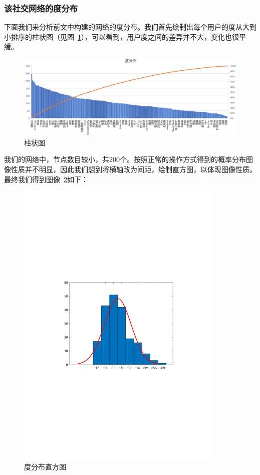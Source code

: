\documentclass[a4paper]{article}
\begin{document}
\begin{spacing}{1.5}
\subsubsection{该社交网络的度分布}

下面我们来分析前文中构建的网络的度分布。我们首先绘制出每个用户的度从大到小排序的柱状图（见图~\ref{zzt}），可以看到，用户度之间的差异并不大，变化也很平缓。
\begin{figure}[H]
  \centering
  \includegraphics[width=15cm]{fig/f8.png}
  \caption{柱状图}\label{zzt}
\end{figure}
我们的网络中，节点数目较小，共200个。按照正常的操作方式得到的概率分布图像性质并不明显，因此我们想到将横轴改为间距，绘制直方图，以体现图像性质。最终我们得到图像~\ref{zft}如下：

\begin{figure}[H]
  \centering
  \includegraphics[width=10cm]{fig/f7.pdf}
  \caption{度分布直方图}\label{zft}
\end{figure}


\end{spacing}
\end{document}
